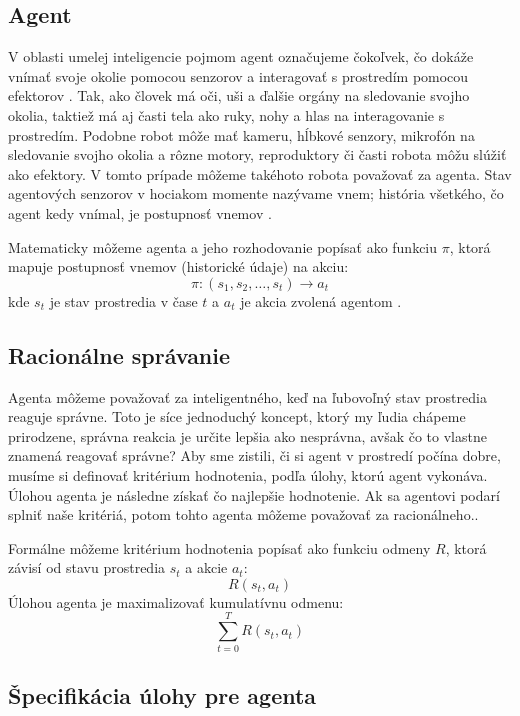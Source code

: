 \subsection{Agent}

V oblasti umelej inteligencie pojmom agent označujeme čokoľvek, čo dokáže vnímať svoje okolie pomocou senzorov a interagovať s prostredím pomocou efektorov \cite{artificial_intelligence_modern_aproach}. Tak, ako človek má oči, uši a ďalšie orgány na sledovanie svojho okolia, taktiež má aj časti tela ako ruky, nohy a hlas na interagovanie s prostredím. Podobne robot môže mať kameru, hĺbkové senzory, mikrofón na sledovanie svojho okolia a rôzne motory, reproduktory či časti robota môžu slúžiť ako efektory. V tomto prípade môžeme takéhoto robota považovať za agenta. Stav agentových senzorov v hociakom momente nazývame vnem; história všetkého, čo agent kedy vnímal, je postupnosť vnemov \cite{artificial_intelligence_modern_aproach}.

Matematicky môžeme agenta a jeho rozhodovanie popísať ako funkciu $\pi$, ktorá mapuje postupnosť vnemov (historické údaje) na akciu:
\[
\pi: (s_1, s_2, \ldots, s_t) \rightarrow a_t
\]
kde $s_t$ je stav prostredia v čase $t$ a $a_t$ je akcia zvolená agentom \cite{artificial_intelligence_modern_aproach}.

\subsection{Racionálne správanie}

Agenta môžeme považovať za inteligentného, keď na ľubovoľný stav prostredia reaguje správne. Toto je síce jednoduchý koncept, ktorý my ľudia chápeme prirodzene, správna reakcia je určite lepšia ako nesprávna, avšak čo to vlastne znamená reagovať správne? Aby sme zistili, či si agent v prostredí počína dobre, musíme si definovať kritérium hodnotenia, podľa úlohy, ktorú agent vykonáva. Úlohou agenta je následne získať čo najlepšie hodnotenie. Ak sa agentovi podarí splniť naše kritériá, potom tohto agenta môžeme považovať za racionálneho.\cite{artificial_intelligence_modern_aproach}.

Formálne môžeme kritérium hodnotenia popísať ako funkciu odmeny $R$, ktorá závisí od stavu prostredia $s_t$ a akcie $a_t$:
\[
R(s_t, a_t)
\]
Úlohou agenta je maximalizovať kumulatívnu odmenu:
\[
\sum_{t=0}^{T} R(s_t, a_t)
\]

\subsection{Špecifikácia úlohy pre agenta}

